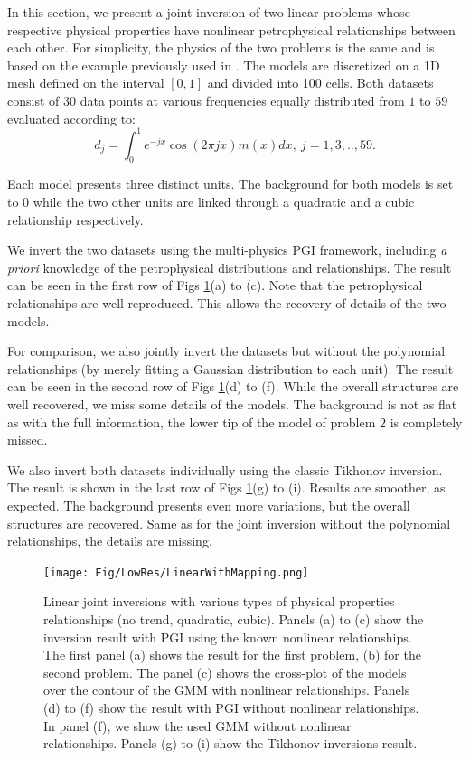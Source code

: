 In this section, we present a joint inversion of two linear problems whose respective physical properties have nonlinear petrophysical relationships between each other. For simplicity, the physics of the two problems is the same and is based on the example previously used in \citet{Li1996}. The models are discretized on a 1D mesh defined on the interval $[0, 1]$ and divided into 100 cells. Both datasets consist of $30$ data points at various frequencies equally distributed from $1$ to $59$ evaluated according to:
\begin{equation}
d_j = \int_0^1 e^{-jx}\cos(2\pi j x) m(x) dx, ~j=1, 3, .., 59.
\end{equation}

Each model presents three distinct units. The background for both models is set to $0$ while the two other units are linked through a quadratic and a cubic relationship respectively.

We invert the two datasets using the multi-physics PGI framework, including \textit{a priori} knowledge of the petrophysical distributions and relationships. The result can be seen in the first row of Figs \ref{fig:LinearWithMapping.png}(a) to (c). Note that the petrophysical relationships are well reproduced. This allows the recovery of details of the two models.

For comparison, we also jointly invert the datasets but without the polynomial relationships (by merely fitting a Gaussian distribution to each unit). The result can be seen in the second row of Figs \ref{fig:LinearWithMapping.png}(d) to (f). While the overall structures are well recovered, we miss some details of the models. The background is not as flat as with the full information, the lower tip of the model of problem $2$ is completely missed.

We also invert both datasets individually using the classic Tikhonov inversion. The result is shown in the last row of Figs \ref{fig:LinearWithMapping.png}(g) to (i). Results are smoother, as expected. The background presents even more variations, but the overall structures are recovered. Same as for the joint inversion without the polynomial relationships, the details are missing.

\begin{figure}
    \texttt{[image: Fig/LowRes/LinearWithMapping.png]}
    \caption{Linear joint inversions with various types of physical properties relationships (no trend, quadratic, cubic). Panels (a) to (c) show the inversion result with PGI using the known nonlinear relationships. The first panel (a) shows the result for the first problem, (b) for the second problem. The panel (c) shows the cross-plot of the models over the contour of the GMM with nonlinear relationships. Panels (d) to (f) show the result with PGI without nonlinear relationships. In panel (f), we show the used GMM without nonlinear relationships. Panels (g) to (i) show the Tikhonov inversions result.}
    \label{fig:LinearWithMapping.png}
\end{figure}

